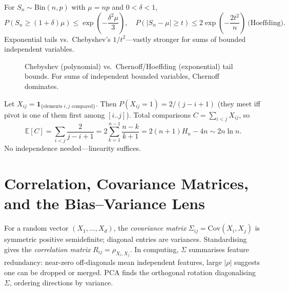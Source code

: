 \begin{theorem} For $S_n\sim\mathrm{Bin}(n,p)$ with $\mu=np$ and $0<\delta<1$,
\[
P(S_n\ge(1+\delta)\mu)\le\exp\!\left(-\frac{\delta^2\mu}{3}\right),\quad
P(|S_n-\mu|\ge t)\le2\exp\!\left(-\frac{2t^2}{n}\right)\ \text{(Hoeffding)}.
\]
Exponential tails vs.\ Chebyshev's $1/t^2$---vastly stronger for sums of bounded independent variables.
\end{theorem}

\begin{figure}[h]
\centering
{}
\caption{Chebyshev (polynomial) vs.\ Chernoff/Hoeffding (exponential) tail bounds. For sums of independent bounded variables, Chernoff dominates.}
\label{fig:tail-bounds}
\end{figure}

\begin{example} Let $X_{ij}=\mathbf{1}_{\{\text{elements }i,j\text{ compared}\}}$. Then $P(X_{ij}=1)=2/(j-i+1)$ (they meet iff pivot is one of them first among $[i..j]$). Total comparisons $C=\sum_{i<j}X_{ij}$, so
\[
\mathbb{E}[C]=\sum_{i<j}\frac2{j-i+1}=2\sum_{k=1}^{n-1}\frac{n-k}{k+1}=2(n+1)H_n-4n\sim2n\ln n.
\]
No independence needed---linearity suffices.
\end{example}

\section{Correlation, Covariance Matrices, and the Bias--Variance Lens}
\label{sec:cov-mat}
For a random vector $(X_1,\dots,X_d)$, the \emph{covariance matrix} $\Sigma_{ij}=\mathrm{Cov}(X_i,X_j)$ is symmetric positive semidefinite; diagonal entries are variances. Standardising gives the \emph{correlation matrix} $R_{ij}=\rho_{X_i,X_j}$. In computing, $\Sigma$ summarises feature redundancy: near-zero off-diagonals mean independent features, large $|\rho|$ suggests one can be dropped or merged. PCA finds the orthogonal rotation diagonalising $\Sigma$, ordering directions by variance.

